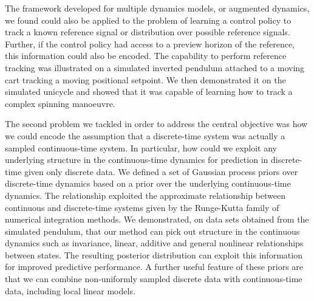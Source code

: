 The framework developed for multiple dynamics models, or augmented dynamics, we found could also be applied to the problem of learning a control policy to track a known reference signal or distribution over possible reference signals. Further, if the control policy had access to a preview horizon of the reference, this information could also be encoded. The capability to perform reference tracking was illustrated on a simulated inverted pendulum attached to a moving cart tracking a moving positional setpoint. We then demonstrated it on the simulated unicycle and showed that it was capable of learning how to track a complex spinning manoeuvre. 



The second problem we tackled in order to address the central objective was how we could encode the assumption that a discrete-time system was actually a sampled continuous-time system. In particular, how could we exploit any underlying structure in the continuous-time dynamics for prediction in discrete-time given only discrete data. We defined a set of Gaussian process priors over discrete-time dynamics based on a prior over the underlying continuous-time dynamics. The relationship exploited the approximate relationship between continuous and discrete-time systems given by the Runge-Kutta family of numerical integration methods. We demonstrated, on data sets obtained from the simulated pendulum, that our method can pick out structure in the continuous dynamics such as invariance, linear, additive and general nonlinear relationships between states. The resulting posterior distribution can exploit this information for improved predictive performance. A further useful feature of these priors are that we can combine non-uniformly sampled discrete data with continuous-time data, including local linear models.



